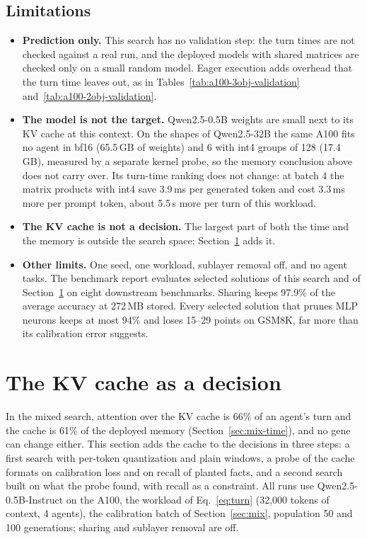 \documentclass[11pt]{article}
\begin{document}
\subsection{Limitations}
\begin{itemize}
  \item \textbf{Prediction only.} This search has no validation step: the turn times are not checked
        against a real run, and the deployed models with shared matrices are checked only on a small
        random model. Eager execution adds overhead that the turn time leaves out, as in
        Tables~\ref{tab:a100-3obj-validation} and~\ref{tab:a100-2obj-validation}.
  \item \textbf{The model is not the target.} Qwen2.5-0.5B weights are small next to its KV cache at this
        context. On the shapes of Qwen2.5-32B the same A100 fits no agent in bf16 (65.5\,GB of weights)
        and 6 with int4 groups of 128 (17.4\,GB), measured by a separate kernel probe, so the memory
        conclusion above does not carry over. Its turn-time ranking does not change: at batch 4 the
        matrix products with int4 save 3.9\,ms per generated token and cost 3.3\,ms more per prompt
        token, about 5.5\,s more per turn of this workload.
  \item \textbf{The KV cache is not a decision.} The largest part of both the time and the memory is outside
        the search space; Section~\ref{sec:kv} adds it.
  \item \textbf{Other limits.} One seed, one workload, sublayer removal off, and no agent tasks. The
        benchmark report evaluates selected solutions of this search and of Section~\ref{sec:kv} on eight
        downstream benchmarks. Sharing keeps 97.9\% of the average accuracy at 272\,MB stored. Every
        selected solution that prunes MLP neurons keeps at most 94\% and loses 15--29 points on GSM8K,
        far more than its calibration error suggests.
\end{itemize}

\section{The KV cache as a decision}
\label{sec:kv}

In the mixed search, attention over the KV cache is 66\% of an agent's turn and the cache is 61\% of the
deployed memory (Section~\ref{sec:mix-time}), and no gene can change either. This section adds the cache to
the decisions in three steps: a first search with per-token quantization and plain windows, a probe of the
cache formats on calibration loss and on recall of planted facts, and a second search built on what the
probe found, with recall as a constraint. All runs use Qwen2.5-0.5B-Instruct on the A100, the workload of
Eq.~\eqref{eq:turn} (32{,}000 tokens of context, 4 agents), the calibration batch of Section~\ref{sec:mix},
population 50 and 100 generations; sharing and sublayer removal are off.
\end{document}
